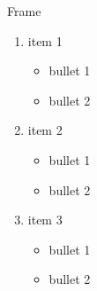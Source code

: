 \documentclass[]{beamer}
\begin{document}
\begin{frame}[t]{Frame}

\begin{enumerate}

\item item 1

   \begin{itemize}
       \item bullet 1
       \item bullet 2
   \end{itemize}

\item item 2

   \begin{itemize}
       \item bullet 1
       \item bullet 2
   \end{itemize}

\item item 3

   \begin{itemize}
       \item bullet 1
       \item bullet 2
   \end{itemize}

\end{enumerate}
\end{frame}
\end{document}
